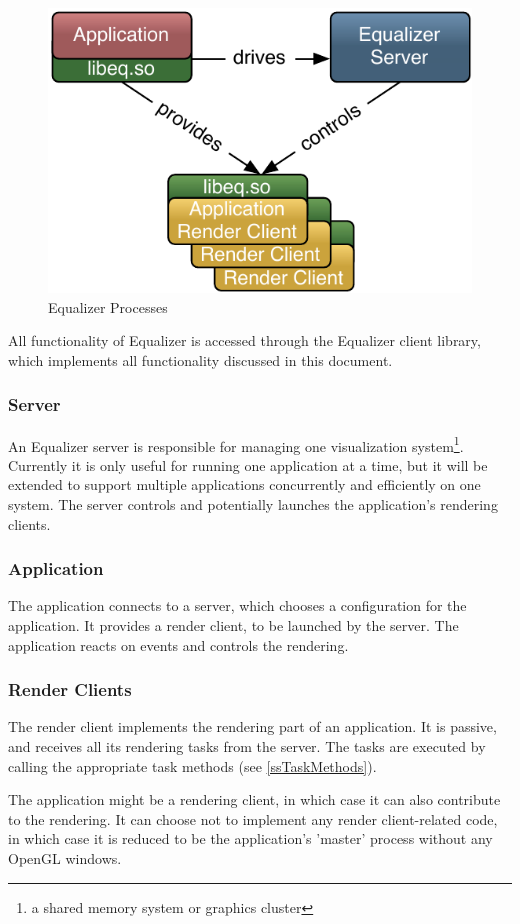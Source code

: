\documentclass[10pt,a4]{scrartcl}
\begin{document}
\begin{figure}
  \includegraphics[width=.4\textwidth]{images/processes.pdf}
  {\caption{\small\label{fProcesses}Equalizer Processes}}
\end{figure}
All functionality of Equalizer is accessed through the Equalizer client
library, which implements all functionality discussed in this document.

\subsubsection{Server}

An Equalizer server is responsible for managing one visualization
system\footnote{a shared memory system or graphics cluster}. Currently
it is only useful for running one application at a time, but it will be
extended to support multiple applications concurrently and efficiently
on one system. The server controls and potentially launches the
application's rendering clients.

\subsubsection{Application}

The application connects to a server, which chooses a configuration for
the application. It provides a render client, to be launched by the
server. The application reacts on events and controls the rendering.

\subsubsection{Render Clients}

The render client implements the rendering part of an application. It is
passive, and receives all its rendering tasks from the server. The tasks
are executed by calling the appropriate task methods (see
\ref{ssTaskMethods}).

The application might be a rendering client, in which case it can also
contribute to the rendering. It can choose not to implement any render
client-related code, in which case it is reduced to be the application's
'master' process without any OpenGL windows.
\end{document}

